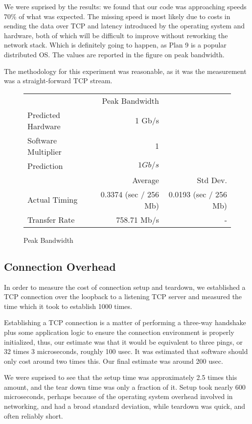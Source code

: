 \documentclass[letterpaper,twocolumn,10pt]{article}
\begin{document}
We were suprised by the results: we found that our code was approaching speeds 70\% of what was expected. The missing speed is most likely due to costs in sending the data over TCP and latency introduced by the operating system and hardware, both of which will be difficult to improve without reworking the network stack. Which is definitely going to happen, as Plan 9 is a popular distributed OS. The values are reported in the figure on peak bandwidth.

The methodology for this experiment was reasonable, as it was the measurement was a straight-forward TCP stream.

\begin{figure}
	\centering
    \begin{tabular}{l r r}
      & Peak Bandwidth \\
      Predicted Hardware & 1 Gb/s\\
      Software Multiplier & 1 \\
      Prediction & $1Gb/s$ \\
                   & Average & Std Dev.\\
        Actual Timing & 0.3374 (sec / 256 Mb) &  0.0193 (sec / 256 Mb) \\
        Transfer Rate & 758.71 Mb/s &  - \\
\end{tabular}
\caption{Peak Bandwidth}
\label{tab:peakbandwidth}
\end{figure}

\subsection{Connection Overhead}

In order to measure the cost of connection setup and teardown, we established a TCP connection over the loopback to a listening TCP server and measured the time which it took to establish 1000 times. 

Establishing a TCP connection is a matter of performing a three-way handshake plus some application logic to ensure the connection environment is properly initialized, thus, our estimate was that it would be equivalent to three pings, or 32 times 3 microseconds, roughly 100 usec. It was estimated that software should only cost around two times this. Our final estimate was around 200 usec.

We were suprised to see that the setup time was approximately 2.5 times this amount, and the tear down time was only a fraction of it. Setup took nearly 600 microseconds, perhaps because of the operating system overhead involved in networking, and had a broad standard deviation, while teardown was quick, and often reliably short.
\end{document}

